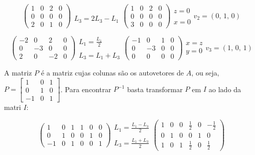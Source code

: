 \begin{enumerate}
	$$
	\begin{pmatrix}
		1 & 0 & 2 & 0 \\
		0 & 0 & 0 & 0 \\
		2 & 0 & 1 & 0
	\end{pmatrix}		
	\begin{array}{c}
		\\ \\ L_3 = 2L_3 - L_1
	\end{array}	
	\begin{pmatrix}
		1 & 0 & 2 & 0 \\
		0 & 0 & 0 & 0 \\
		3 & 0 & 0 & 0
	\end{pmatrix}
	\begin{array}{c}
		z = 0 \\
		\\
		x = 0
	\end{array}	
	v_2 = (0, \, 1, \, 0)	
	$$
	
	$$
	\begin{pmatrix}
		-2 & 0 & 2 & 0 \\
		0 & -3 & 0 & 0 \\
		2 & 0 & -2 & 0
	\end{pmatrix}		
	\begin{array}{c}
		L_1 = \frac{L_1}{2} \\
		\\
		L_3 = L_1 + L_3
	\end{array}	
	\begin{pmatrix}
		-1 & 0 & 1 & 0 \\
		0 & -3 & 0 & 0 \\
		0 & 0 & 0 & 0
	\end{pmatrix}
	\begin{array}{c}
		x = z \\
		y = 0
	\end{array}	
	v_3 = (1, \, 0, \, 1)	
	$$
	
	A matriz $P$ é a matriz cujas colunas
	são os autovetores de $A$, ou seja, 
	$P = \begin{bmatrix}
		1 & 0 & 1 \\
		0 & 1 & 0 \\
		-1 & 0 & 1
	\end{bmatrix}
	$. Para encontrar $P^{-1}$ basta transformar
	$P$ em $I$ ao lado da matri $I$:
	
	$$
	\begin{pmatrix}
		1  & 0 & 1 & 1 & 0 & 0\\
		0  & 1 & 0 & 0 & 1 & 0\\
		-1 & 0 & 1 & 0 & 0 & 1
	\end{pmatrix}
	\begin{array}{c}
		L_1 = \frac{L_1-L_3}{2} \\ \\
		L_3 = \frac{L_1 + L_3}{2}
	\end{array}
	\begin{pmatrix}
		1 & 0 & 0 & \frac{1}{2} & 0 & -\frac{1}{2}\\
		0 & 1 & 0 & 0 & 1 & 0\\
		1 & 0 & 1 & \frac{1}{2} & 0 & \frac{1}{2}
	\end{pmatrix}
	$$
	

\end{enumerate}
